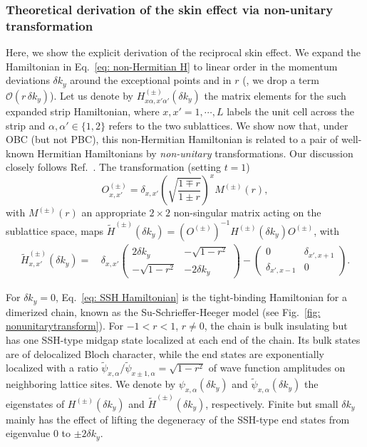 \subsubsection{Theoretical derivation of the skin effect via non-unitary transformation}
Here, we show the explicit derivation of the reciprocal skin effect. We expand the Hamiltonian in Eq.~\eqref{eq: non-Hermitian H} to linear order in the momentum deviations $\delta k_y$ around the exceptional points and in $r$ (\ie, we drop a term $\mathcal{O}(r\,\delta k_y)$). Let us denote by $H^{(\pm)}_{x\alpha,x'\alpha'}(\delta k_y)$ the matrix elements for the such expanded strip Hamiltonian,
where $x,x'=1,\cdots, L$ labels the unit cell across the strip and $\alpha,\alpha'\in\{1,2\}$ refers to the two sublattices. We show now that, under OBC (but not PBC), this non-Hermitian Hamiltonian is related to a pair of well-known Hermitian Hamiltonians by \emph{non-unitary} transformations. Our discussion closely follows Ref.~\cite{Shunyu2018prl}. The transformation (setting $t=1$)
\begin{equation}
O_{x,x'}^{(\pm)}=\delta_{x,x'}\left(\sqrt{\frac{1\mp r}{1\pm r}}\right)^x M^{(\pm)}(r),
\end{equation}
with $M^{(\pm)}(r)$ an appropriate $2 \times2 $ non-singular matrix acting on the sublattice space, maps  $\tilde{H}^{(\pm)}(\delta k_y)=\left(O^{(\pm)}\right)^{-1}H^{(\pm)}(\delta k_y)O^{(\pm)}$, with
\begin{equation}
\begin{aligned}
\tilde{H}^{(\pm)}_{x,x'}(\delta k_y)
=&\,
\delta_{x,x'}
\begin{pmatrix}
2\delta k_y&-\sqrt{1-r^2}\\
-\sqrt{1-r^2}&-2\delta k_y
\end{pmatrix}
-
\begin{pmatrix}
0&\delta_{x',x+1}\\
\delta_{x',x-1}&0
\end{pmatrix}.
\end{aligned}
\label{eq: SSH Hamiltonian}
\end{equation}

For $\delta k_y=0$, Eq.~\eqref{eq: SSH Hamiltonian} is the tight-binding Hamiltonian for a dimerized chain, known as the Su-Schrieffer-Heeger model (see Fig.~\ref{fig: nonunitarytransform}). For $-1<r<1$, $r\neq0$, the chain is bulk insulating but has one SSH-type midgap state localized at each end of the chain. Its bulk states are of delocalized Bloch character, while the end states are exponentially localized with a ratio $\tilde{\psi}_{x,\alpha}/\tilde{\psi}_{x\pm1,\alpha}=\sqrt{1-r^2}$ of wave function amplitudes on neighboring lattice sites. We denote by $\psi_{x,\alpha}(\delta k_y)$ and $\tilde{\psi}_{x,\alpha}(\delta{k_y})$ the eigenstates of $H^{(\pm)}(\delta k_y)$ and $\tilde{H}^{(\pm)}(\delta k_y)$, respectively. Finite but small $\delta k_y$ mainly has the effect of lifting the degeneracy of the SSH-type end states from eigenvalue $0$ to $\pm 2\delta k_y$. 

